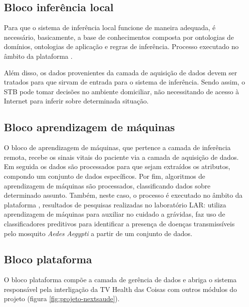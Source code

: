 \subsection{Bloco inferência local}

Para que o sistema de inferência local funcione de maneira adequada, é
necessário, basicamente, a base de conhecimentos composta por ontologias de
domínios, ontologias de aplicação e regras de inferência. Processo executado
no âmbito da plataforma \nextsaude.

Além disso, os dados provenientes da camada de aquisição de dados devem ser
tratados para que sirvam de entrada para o sistema de inferência. Sendo assim,
o STB pode tomar decisões no ambiente domiciliar, não necessitando de acesso
à Internet para inferir sobre determinada situação.

\subsection{Bloco aprendizagem de máquinas}

O bloco de aprendizagem de máquinas, que pertence a camada de inferência
remota, recebe os sinais vitais do paciente via a camada de aquisição de dados.
Em seguida os dados são processados para que sejam extraídos os atributos,
compondo um conjunto de dados específicos. Por fim, algoritmos de aprendizagem
de máquinas são processados, classificando dados sobre determinado assunto.
Também, neste caso, o processo é executado no âmbito da plataforma \nextsaude,
resultados de pesquisas realizadas no laboratório LAR: \citeauthor{mario2016}
utiliza aprendizagem de máquinas para auxiliar no cuidado a grávidas,
\citeauthor{bragamobile} faz uso de classificadores preditivos para identificar
a presença de doenças transmissíveis pelo mosquito \textit{Aedes Aegypti} a
partir de um conjunto de dados. 

\subsection{Bloco plataforma \nextsaude}

O bloco plataforma \nextsaude[] compõe a camada de gerência de dados e abriga
o sistema responsável pela interligação da TV Health das Coisas com outros módulos
do projeto \nextsaude[] (figura \ref{fig:projeto-nextsaude}).


